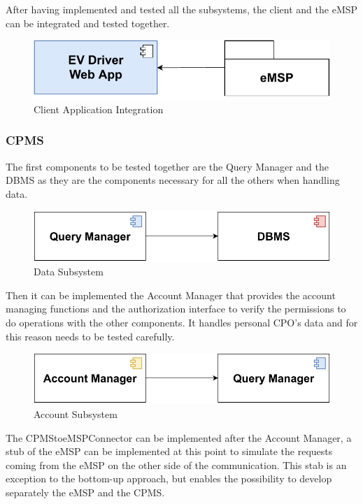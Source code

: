 After having implemented and tested all the subsystems, the client and the eMSP can be integrated 
and tested together. 
\begin{figure}[H]
    \centering
    \includegraphics[scale=0.6]{src/Integration/eMSPFrontend.pdf}
    \caption{Client Application Integration}
\end{figure}


\subsubsection{CPMS}
The first components to be tested together are the Query Manager and the DBMS as they are the
components necessary for all the others when handling data.
\begin{figure}[H]
    \centering
    \includegraphics[scale=0.6]{src/Integration/CPMSQuery.pdf}
    \caption{Data Subsystem}
\end{figure}
Then it can be implemented the Account Manager that provides the account managing functions and the authorization interface 
to verify the permissions to do operations with the other components. It handles personal CPO's data and for this reason needs
to be tested carefully.
\begin{figure}[H]
    \centering
    \includegraphics[scale=0.6]{src/Integration/CPMSAccount.pdf}
    \caption{Account Subsystem}
\end{figure}
The CPMStoeMSPConnector can be implemented after the Account Manager, a stub of the eMSP can be implemented at this point to simulate
the requests coming from the eMSP on the other side of the communication. This stab is an exception to the bottom-up approach, but
enables the possibility to develop separately the eMSP and the CPMS. 
